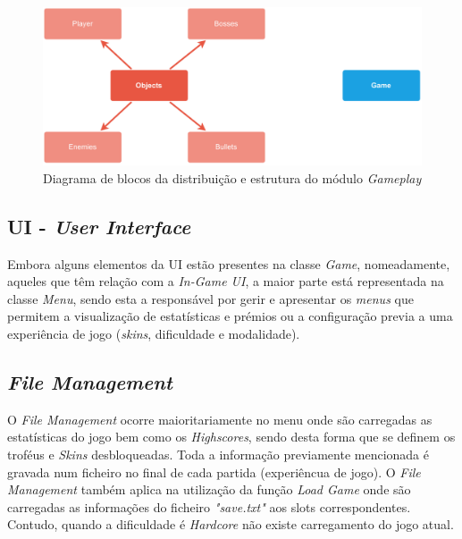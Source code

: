 \documentclass[a4paper,11pt]{article}
\begin{document}
\vspace{8pt}

\begin{figure}[]
    \centering
    \includegraphics[scale = 0.50]{2 - Esquemas/ClassGameplay.pdf}
    \caption{Diagrama de blocos da distribuição e estrutura do módulo \textit{Gameplay}}
    \label{fig:ClassGameplay}
\end{figure}

\vspace{8pt}

\subsection*{UI - \textit{User Interface}}

\vspace{8pt}

Embora alguns elementos da UI estão presentes na classe \textit{Game}, nomeadamente, aqueles que têm relação com a \textit{In-Game UI}, a maior parte está representada na classe \textit{Menu}, sendo esta a responsável por gerir e apresentar os \textit{menus} que permitem a visualização de estatísticas e prémios ou a configuração previa a uma experiência de jogo (\textit{skins}, dificuldade e modalidade).


\vspace{8pt}

\subsection*{\textit{File Management}}
O \textit{File Management} ocorre maioritariamente no menu onde são carregadas as estatísticas do jogo bem como os \textit{Highscores}, sendo desta forma que se definem os troféus e \textit{Skins} desbloqueadas. Toda a informação previamente mencionada é gravada num ficheiro no final de cada partida (experiêncua de jogo). O \textit{File Management} também aplica na utilização da função  \textit{Load Game} onde são carregadas as informações do ficheiro \textit{"save.txt"} aos slots correspondentes. Contudo, quando a dificuldade é \textit{Hardcore} não existe carregamento do jogo atual.
\end{document}
